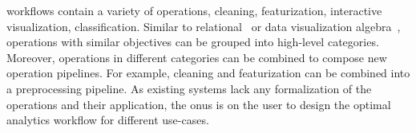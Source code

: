 
\vita workflows contain a variety of operations, \eg cleaning, featurization, interactive visualization, classification. Similar to relational~\cite{codd} or data visualization algebra~\cite{satyanarayan2016vega}, \vita operations with similar objectives can be grouped into high-level categories. Moreover, operations in different categories can be combined to compose new operation pipelines. For example, cleaning and featurization can be combined into a preprocessing pipeline. As existing systems lack any formalization of the operations and their application, the onus is on the user to design the optimal analytics workflow for different use-cases.


